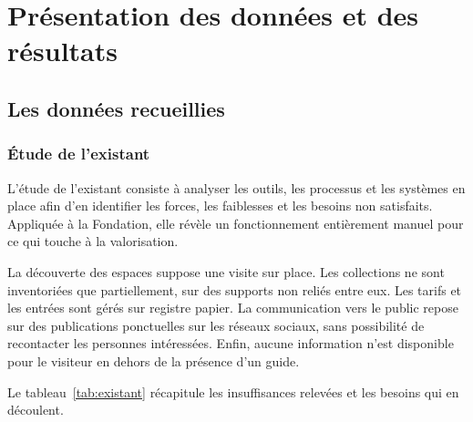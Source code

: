 \section{Présentation des données et des résultats}
\label{sec:donnees}

\subsection{Les données recueillies}

\subsubsection{Étude de l'existant}

L'étude de l'existant consiste à analyser les outils, les processus et les
systèmes en place afin d'en identifier les forces, les faiblesses et les besoins
non satisfaits. Appliquée à la Fondation, elle révèle un fonctionnement
entièrement manuel pour ce qui touche à la valorisation.

La découverte des espaces suppose une visite sur place. Les collections ne sont
inventoriées que partiellement, sur des supports non reliés entre eux. Les
tarifs et les entrées sont gérés sur registre papier. La communication vers le
public repose sur des publications ponctuelles sur les réseaux sociaux, sans
possibilité de recontacter les personnes intéressées. Enfin, aucune information
n'est disponible pour le visiteur en dehors de la présence d'un guide.

Le tableau~\ref{tab:existant} récapitule les insuffisances relevées et les
besoins qui en découlent.

